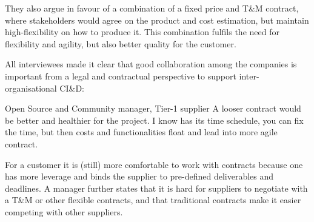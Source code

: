 They also argue in favour of a combination of a fixed price and T\&M contract, where stakeholders would agree on the product and cost estimation, but maintain high-flexibility on how to produce it. This combination fulfils the need for flexibility and agility, but also better quality for the customer. %


All interviewees made it clear that good collaboration among the companies is important from a legal and contractual perspective to support inter-organisational CI\&D:

\begin{aquote}{Open Source and Community manager, Tier-1 supplier}
A looser contract would be better and healthier for the project. I know \company{} has its time schedule, you can fix the time, but then costs and functionalities float and lead into more agile contract.
\end{aquote}



 For a customer it is (still) more comfortable to work with contracts because one has more leverage and binds the supplier to pre-defined deliverables and deadlines. A \company{} manager %
further states that it is hard for suppliers to negotiate with a T\&M or other flexible contracts, and that traditional contracts make it easier competing with other suppliers.


